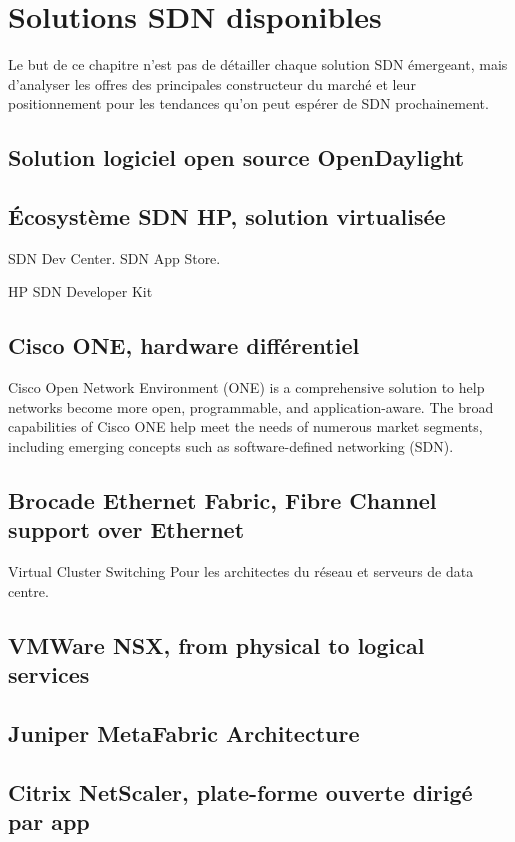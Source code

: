 \chapter{Solutions SDN disponibles}

Le but de ce chapitre n'est pas de détailler chaque solution SDN émergeant, mais d'analyser les offres des principales constructeur du marché et leur positionnement pour les tendances qu'on peut espérer de SDN prochainement.

\section{Solution logiciel open source OpenDaylight}

\section{Écosystème SDN HP, solution virtualisée}

SDN Dev Center.
SDN App Store.

HP SDN Developer Kit


\section{Cisco ONE, hardware différentiel}

Cisco Open Network Environment (ONE) is a comprehensive solution to help networks become more open, programmable, and application-aware. The broad capabilities of Cisco ONE help meet the needs of numerous market segments, including emerging concepts such as software-defined networking (SDN).

\section{Brocade Ethernet Fabric, Fibre Channel support over Ethernet}
Virtual Cluster Switching
Pour les architectes du réseau et serveurs de data centre.

\section{VMWare NSX, from physical to logical services}

\section{Juniper MetaFabric Architecture}

\section{Citrix NetScaler, plate-forme ouverte dirigé par app }



